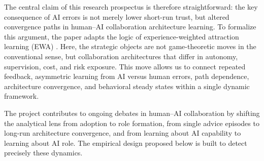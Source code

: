 The central claim of this research prospectus is therefore straightforward: the key consequence of AI errors is not merely lower short-run trust, but altered convergence paths in human--AI collaboration architecture learning. To formalize this argument, the paper adapts the logic of experience-weighted attraction learning (EWA) \citep{camerer1999ewa}. Here, the strategic objects are not game-theoretic moves in the conventional sense, but collaboration architectures that differ in autonomy, supervision, cost, and risk exposure. This move allows us to connect repeated feedback, asymmetric learning from AI versus human errors, path dependence, architecture convergence, and behavioral steady states within a single dynamic framework.

The project contributes to ongoing debates in human--AI collaboration by shifting the analytical lens from adoption to role formation, from single advice episodes to long-run architecture convergence, and from learning about AI capability to learning about AI role. The empirical design proposed below is built to detect precisely these dynamics.
